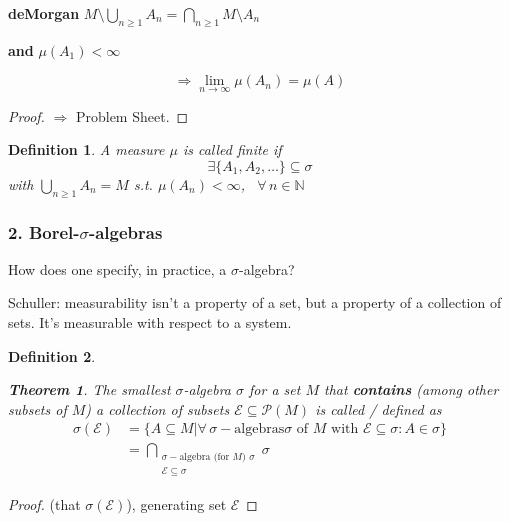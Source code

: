 \documentclass[10pt]{amsart}
\newtheorem{theorem}{Theorem}
\newtheorem{definition}{Definition}
\begin{document}
\begin{multicols*}{2}
\begin{enumerate}
	\textbf{deMorgan} $M \setminus \bigcup_{n \geq 1} A_n = \bigcap_{n \geq 1} M \setminus A_n$

	\textbf{ and } $\mu (A_1) < \infty$

\[
\Longrightarrow \lim_{n \to \infty} \mu(A_n) = \mu(A)
\]

\begin{proof}
	$\Longrightarrow$ Problem Sheet.
\end{proof}

\end{enumerate}


\begin{definition} A measure $\mu$ is called finite if 
	\[
	\exists \lbrace A_1, A_2, \dots \rbrace \subseteq \sigma
	\]
	with $\bigcup_{n \geq 1} A_n = M$ s.t. $\mu (A_n) < \infty$, \, $\forall \, n \in \mathbb{N}$
\end{definition}

\subsubsection{2. Borel-$\sigma$-algebras}

How does one specify, in practice, a $\sigma$-algebra?

Schuller: measurability isn't a property of a set, but a property of a collection of sets. It's measurable with respect to a system.

\begin{definition}
	\begin{theorem}
		The smallest $\sigma$-algebra $\sigma$ for a set $M$ that \textbf{contains} (among other subsets of $M$) a collection of subsets $\mathcal{E} \subseteq \mathcal{P}(M)$ is called / defined as 
		\[
		\begin{aligned}
		\sigma(\mathcal{E}) & = \lbrace A \subseteq M | \forall \, \sigma-\text{algebras} \sigma \text{ of } M \text{ with } \mathcal{E} \subseteq \sigma: A \in \sigma \rbrace \\
		& = \bigcap_{\substack{ \sigma-\text{algebra (for $M$) } \sigma \\ \mathcal{E} \subseteq \sigma } } \sigma
		\end{aligned}
		\]
	\end{theorem}
\end{definition}

\begin{proof}
	(that $\sigma(\mathcal{E})$), generating set $\mathcal{E}$
\end{proof}


\end{multicols*}
\end{document}

